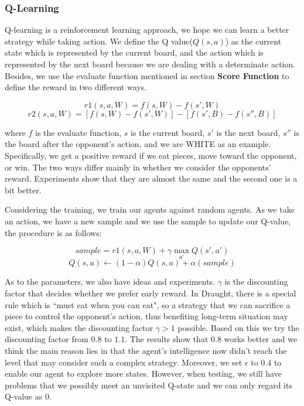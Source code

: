 \subsubsection{Q-Learning}

Q-learning is a reinforcement learning approach, we hope we can learn a better strategy while taking action. 
We define the Q value($Q(s, a)$) as the current state which is represented by the current board, and the action which is represented by the next board because we are dealing with a determinate action. Besides, we use the evaluate function mentioned in section \textbf{Score Function} to define the reward in two different ways.

$$r1(s,a,W) = f(s,W) - f(s',W) $$
$$r2(s,a,W) = [f(s,W) - f(s',W)] - [f(s',B) - f(s'',B)]$$

where $f$ is the evaluate function, $s$ is the current board, $s'$ is the next board, $s''$ is the board after the opponent's action, and we are WHITE as an example. Specifically, we get a positive reward if we eat pieces, move toward the opponent, or win. The two ways differ mainly in whether we consider the opponents' reward. Experiments show that they are almost the same and the second one is a bit better.

Considering the training, we train our agents against random agents. As we take an action, we have a new sample and we use the sample to update our Q-value, the procedure is as follows:

$$sample = r1(s,a,W) + \gamma \mathop{\max}_{{a'}}  Q(s',a')$$
$$Q(s,a) \gets (1 - \alpha)Q(s,a) + \alpha (sample)$$

As to the parameters, we also have ideas and experiments. $\gamma$ is the discounting factor that decides whether we prefer early reward. In Draught, there is a special rule which is ``must eat when you can eat", so a strategy that we can sacrifice a piece to control the opponent's action, thus benefiting long-term situation may exist, which makes the discounting factor $\gamma>1$ possible. Based on this we try the discounting factor from $0.8$ to $1.1$. The results show that $0.8$ works better and we think the main reason lies in that the agent's intelligence now didn't reach the level that may consider such a complex strategy. Moreover, we set $\epsilon$ to $0.4$ to enable our agent to explore more states. However, when testing, we still have problems that we possibly meet an unvisited Q-state and we can only regard its Q-value as $0$.
